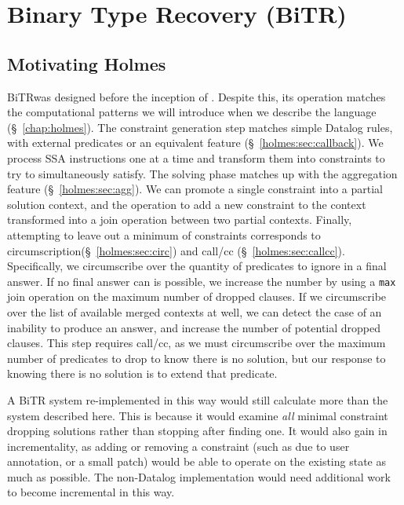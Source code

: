 
\newcommand{\bitr}{{\sc BiTR}}

\chapter{Binary Type Recovery (\bitr)}
\label{chap:bitr}






\section{Motivating Holmes}
\bitr was designed before the inception of {\sysname}.
Despite this, its operation matches the computational patterns we will introduce when we describe the language (\S~\ref{chap:holmes}).
The constraint generation step matches simple Datalog rules, with external predicates or an equivalent feature (\S~\ref{holmes:sec:callback}).
We process SSA instructions one at a time and transform them into constraints to try to simultaneously satisfy.
The solving phase matches up with the aggregation feature (\S~\ref{holmes:sec:agg}).
We can promote a single constraint into a partial solution context, and the operation to add a new constraint to the context transformed into a join operation between two partial contexts.
Finally, attempting to leave out a minimum of constraints corresponds to circumscription(\S~\ref{holmes:sec:circ}) and call/cc (\S~\ref{holmes:sec:callcc}).
Specifically, we circumscribe over the quantity of predicates to ignore in a final answer.
If no final answer can is possible, we increase the number by using a \texttt{max} join operation on the maximum number of dropped clauses.
If we circumscribe over the list of available merged contexts at well, we can detect the case of an inability to produce an answer, and increase the number of potential dropped clauses.
This step requires call/cc, as we must circumscribe over the maximum number of predicates to drop to know there is no solution, but our response to knowing there is no solution is to extend that predicate.

A {\bitr} system re-implemented in this way would still calculate more than the system described here.
This is because it would examine \emph{all} minimal constraint dropping solutions rather than stopping after finding one.
It would also gain in incrementality, as adding or removing a constraint (such as due to user annotation, or a small patch) would be able to operate on the existing state as much as possible.
The non-Datalog implementation would need additional work to become incremental in this way.

